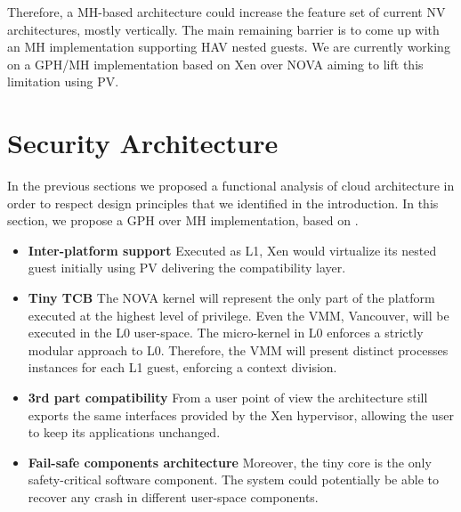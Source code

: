\documentclass{sig-alternate}
\begin{document}
Therefore, a MH-based architecture could increase the feature set of current NV architectures, mostly vertically. The main remaining barrier is to come up with an MH implementation supporting HAV nested guests. We are currently working on a GPH/MH implementation based on Xen over NOVA aiming to lift this limitation using PV.

\section{Security Architecture}
\label{ref:arch}


In the previous sections we proposed a functional analysis of cloud architecture in order to respect design principles that we identified in the introduction. In this section, we propose a GPH over MH implementation, based on .

\begin{itemize}[]
\item \textbf{Inter-platform support} Executed as L1, Xen would virtualize its nested guest initially using PV delivering the compatibility layer.
\item \textbf{Tiny TCB} The NOVA kernel will represent the only part of the platform executed at the highest level of privilege. Even the VMM, Vancouver, will be executed in the L0 user-space. The micro-kernel in L0 enforces a strictly modular approach to L0. Therefore, the VMM will present distinct processes instances for each L1 guest, enforcing a context division.
\item \textbf{3rd part compatibility} From a user point of view the architecture still exports the same interfaces provided by the Xen hypervisor, allowing the user to keep its applications unchanged.
\item \textbf{Fail-safe components architecture} Moreover, the tiny core is the only safety-critical software component. The system could potentially be able to recover any crash in different user-space components.
\end{itemize}
\end{document}
